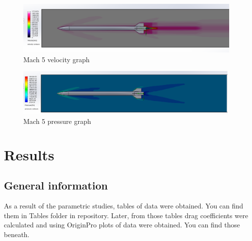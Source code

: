 \documentclass{article}
\begin{document}
\begin{figure}[H]
    \centering
    \includegraphics[width=\textwidth]{Final50Speed}
    \caption{Mach 5 velocity graph}
    \label{fig:Final50Speed}
\end{figure}

\begin{figure}[H]
    \centering
    \includegraphics[width=\textwidth]{Final50Pressure}
    \caption{Mach 5 pressure graph}
    \label{fig:Final50Pressure}
\end{figure}

\section{Results}
\subsection{General information}
As a result of the parametric studies, tables of data were obtained. You can find them in Tables folder in repository. Later, from those tables drag coefficients were calculated and using OriginPro plots of data were obtained. You can find those beneath. 
\end{document}
